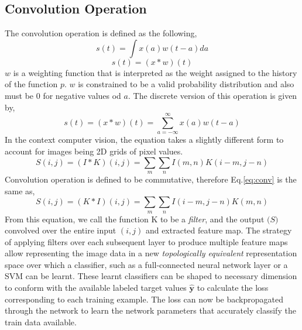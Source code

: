 \subsection*{Convolution Operation}
The convolution operation is defined as the following,
\begin{equation}
s(t) = \int x(a)w(t-a)da
\end{equation}
\begin{equation}
s(t) = (x*w)(t)
\end{equation}
$w$ is a weighting function that is interpreted as the weight assigned to the history of the function $p$. $w$ is constrained to be a valid probability distribution and also must be 0 for negative values od $a$. 
The discrete version of this operation is given by,
\begin{equation}
s(t) = (x*w)(t) = \sum_{a=-\infty}^{\infty}x(a)w(t-a)
\end{equation}
In the context computer vision, the equation takes a slightly different form to account for images being 2D grids of pixel values.
\begin{equation}
\label{eq:conv}
S(i,j) = (I*K)(i,j) = \sum_m \sum_n I(m,n)K(i-m,j-n)
\end{equation}
Convolution operation is defined to be commutative, therefore Eq.\ref{eq:conv} is the same as,
\begin{equation}
S(i,j) = (K*I)(i,j) = \sum_m \sum_n I(i-m, j-n)K(m,n)
\end{equation}
From this equation, we call the function K to be a \textit{filter}, and the output $\bm(S)$ convolved over the entire input $(i,j)$ and extracted feature map. The strategy of applying filters over each subsequent layer to produce multiple feature maps allow representing the image data in a new \textit{topologically equivalent} representation space over which a classifier, such as a full-connected neural network layer or a SVM can be learnt. These learnt classifiers can be shaped to necessary dimension to conform with the available labeled target values $\bm{\hat{y}}$ to calculate the loss corresponding to each training example. The loss can now be backpropagated through the network to learn the network parameters that accurately classify the train data available.

